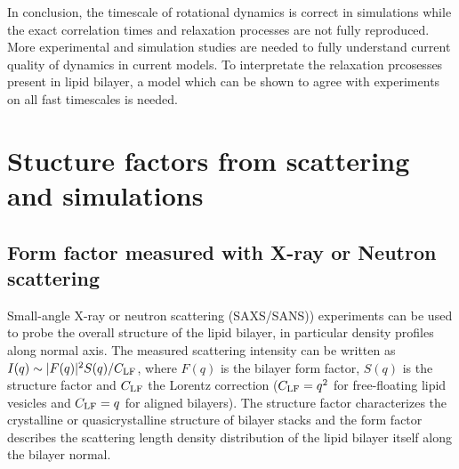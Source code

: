 \documentclass[aps,prl,superscriptaddress,twocolumn]{revtex4}
\begin{document}
In conclusion, the timescale of rotational dynamics is correct in simulations while the exact correlation times
and relaxation processes are not fully reproduced. More experimental and simulation studies are needed 
to fully understand current quality of dynamics in current models. To interpretate the relaxation prcosesses
present in lipid bilayer, a model which can be shown to agree with experiments on all fast timescales is needed.






\section{Stucture factors from scattering and simulations}


\subsection{Form factor measured with X-ray or Neutron scattering}

Small-angle X-ray or neutron scattering (SAXS/SANS)) experiments can be used to
probe the overall structure of the lipid bilayer, in particular density profiles along normal axis.
The measured scattering intensity can be written as 
$I(q)\sim|F(q)|^2S(q) / C_{{\rm LF}}$, where $F(q)$ is the bilayer form 
factor, $S(q)$ is the structure factor and $C_{{\rm LF}}$ the Lorentz correction ($C_{{\rm LF}} = q^2$ 
for free-floating lipid vesicles and $C_{{\rm LF}}=q$ for aligned bilayers). 
The structure factor characterizes the crystalline or quasicrystalline structure of bilayer 
stacks and the form factor describes the scattering length density distribution of the lipid bilayer 
itself along the bilayer normal. 
\end{document}
